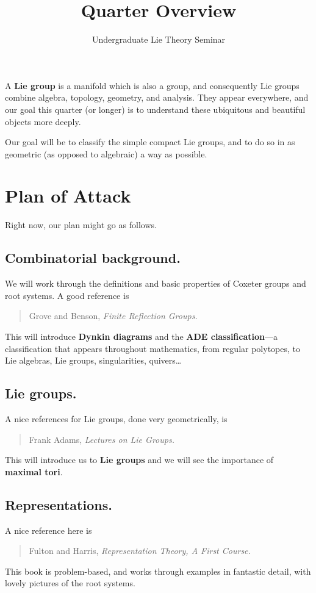\documentclass[12pt]{article}
\title{Quarter Overview}
\author{Undergraduate Lie Theory Seminar}
\date{}
\begin{document}
\maketitle

A \textbf{Lie group} is a manifold which is also a group, and
consequently Lie groups combine algebra, topology, geometry, and
analysis.  They appear everywhere, and our goal this quarter (or
longer) is to understand these ubiquitous and beautiful objects
more deeply.

Our goal will be to classify the simple compact Lie groups, and to do
so in as geometric (as opposed to algebraic) a way as possible.

\section*{Plan of Attack}

Right now, our plan might go as follows.

\subsection*{Combinatorial background.}

We will work through the definitions and basic properties of Coxeter
groups and root systems.  A good reference is
\begin{quote}
Grove and Benson, \textit{Finite Reflection Groups.}
\end{quote}
This will introduce \textbf{Dynkin diagrams} and the \textbf{ADE
  classification}---a classification that appears throughout
mathematics, from regular polytopes, to Lie algebras, Lie groups,
singularities, quivers\ldots

\subsection*{Lie groups.}

A nice references for Lie groups, done very geometrically, is
\begin{quote}
Frank Adams, \textit{Lectures on Lie Groups.}
\end{quote}
This will introduce us to \textbf{Lie groups} and we will see the
importance of \textbf{maximal tori}.

\subsection*{Representations.}

A nice reference here is
\begin{quote}
Fulton and Harris, \textit{Representation Theory, A First Course.}
\end{quote}
This book is problem-based, and works through examples in fantastic
detail, with lovely pictures of the root systems.
\end{document}
